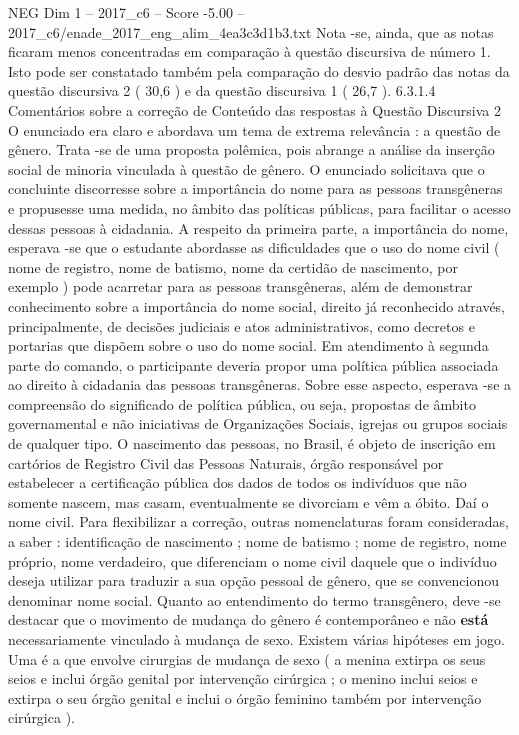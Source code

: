 \begin{textsample}{NEG Dim 1 – 2017\_c6 – Score -5.00 – 2017\_c6/enade\_2017\_eng\_alim\_4ea3c3d1b3.txt}
Nota -se, ainda, que as notas ficaram menos concentradas em comparação à questão discursiva de número 1.
Isto pode ser constatado também pela comparação do desvio padrão das notas da questão discursiva 2 ( 30,6 ) e da questão discursiva 1 ( 26,7 ). 6.3.1.4 Comentários sobre a correção de Conteúdo das respostas à Questão Discursiva 2 O enunciado era claro e abordava um tema de extrema relevância : a questão de gênero.
Trata -se de uma proposta polêmica, pois abrange a análise da inserção social de minoria vinculada à questão de gênero.
O enunciado solicitava que o concluinte discorresse sobre a importância do nome para as pessoas transgêneras e propusesse uma medida, no âmbito das políticas públicas, para facilitar o acesso dessas pessoas à cidadania.
A respeito da primeira parte, a importância do nome, esperava -se que o estudante abordasse as dificuldades que o uso do nome civil ( nome de registro, nome de batismo, nome da certidão de nascimento, por exemplo ) pode acarretar para as pessoas transgêneras, além de demonstrar conhecimento sobre a importância do nome social, direito já reconhecido através, principalmente, de decisões judiciais e atos administrativos, como decretos e portarias que dispõem sobre o uso do nome social.
Em atendimento à segunda parte do comando, o participante deveria propor uma política pública associada ao direito à cidadania das pessoas transgêneras.
Sobre esse aspecto, esperava -se a compreensão do significado de política pública, ou seja, propostas de âmbito governamental e não iniciativas de Organizações Sociais, igrejas ou grupos sociais de qualquer tipo.
O nascimento das pessoas, no Brasil, é objeto de inscrição em cartórios de Registro Civil das Pessoas Naturais, órgão responsável por estabelecer a certificação pública dos dados de todos os indivíduos que não somente nascem, mas casam, eventualmente se divorciam e vêm a óbito.
Daí o nome civil.
Para flexibilizar a correção, outras nomenclaturas foram consideradas, a saber : identificação de nascimento ; nome de batismo ; nome de registro, nome próprio, nome verdadeiro, que diferenciam o nome civil daquele que o indivíduo deseja utilizar para traduzir a sua opção pessoal de gênero, que se convencionou denominar nome social.
Quanto ao entendimento do termo transgênero, deve -se destacar que o movimento de mudança do gênero é contemporâneo e não \textbf{está} necessariamente vinculado à mudança de sexo.
Existem várias hipóteses em jogo.
Uma é a que envolve cirurgias de mudança de sexo ( a menina extirpa os seus seios e inclui órgão genital por intervenção cirúrgica ; o menino inclui seios e extirpa o seu órgão genital e inclui o órgão feminino também por intervenção cirúrgica ).

\end{textsample}
